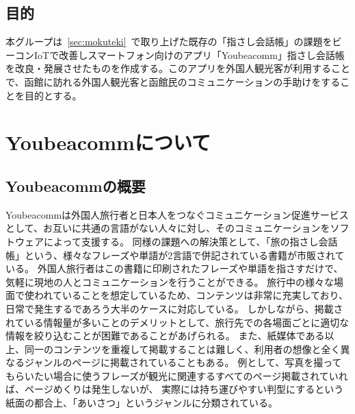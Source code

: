 \documentclass[11pt,papersize]{jsbook}
\begin{document}
\section{目的}
 本グループは~\ref{sec:mokuteki}~で取り上げた既存の「指さし会話帳」の課題をビーコンIoTで改善しスマートフォン向けのアプリ「Youbeacomm」指さし会話帳を改良・発展させたものを作成する。このアプリを外国人観光客が利用することで、函館に訪れる外国人観光客と函館民のコミュニケーションの手助けをすることを目的とする。


\chapter{Youbeacommについて}

\section{Youbeacommの概要}
 Youbeacommは外国人旅行者と日本人をつなぐコミュニケーション促進サービスとして、お互いに共通の言語がない人々に対し、そのコミュニケーションをソフトウェアによって支援する。
同様の課題への解決策として、「旅の指さし会話帳」という、様々なフレーズや単語が2言語で併記されている書籍が市販されている。
外国人旅行者はこの書籍に印刷されたフレーズや単語を指さすだけで、気軽に現地の人とコミュニケーションを行うことができる。
旅行中の様々な場面で使われていることを想定しているため、コンテンツは非常に充実しており、日常で発生するであろう大半のケースに対応している。
しかしながら、掲載されている情報量が多いことのデメリットとして、旅行先での各場面ごとに適切な情報を絞り込むことが困難であることがあげられる。
また、紙媒体である以上、同一のコンテンツを重複して掲載することは難しく、利用者の想像と全く異なるジャンルのページに掲載されていることもある。
例として、写真を撮ってもらいたい場合に使うフレーズが観光に関連するすべてのページ掲載されていれば、ページめくりは発生しないが、
実際には持ち運びやすい判型にするという紙面の都合上、「あいさつ」というジャンルに分類されている。
\end{document}

